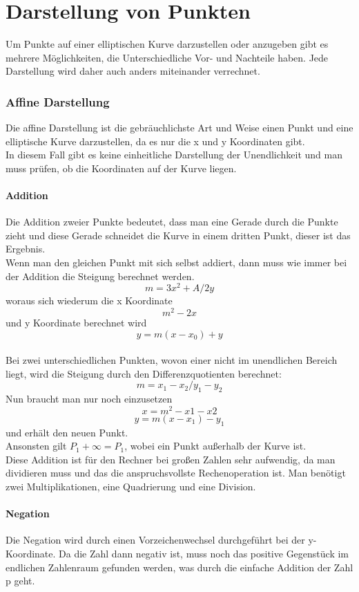 \chapter{Darstellung von Punkten}
Um Punkte auf einer elliptischen Kurve darzustellen oder anzugeben gibt es mehrere Möglichkeiten, die Unterschiedliche Vor- und Nachteile haben. Jede Darstellung wird daher auch anders miteinander verrechnet.
\subsection{Affine Darstellung}
Die affine Darstellung ist die gebräuchlichste Art und Weise einen Punkt und eine elliptische Kurve darzustellen, da es nur die x und y Koordinaten gibt.\\
In diesem Fall gibt es keine einheitliche Darstellung der Unendlichkeit und man muss prüfen, ob die Koordinaten auf der Kurve liegen.
\subsubsection{Addition}
Die Addition zweier Punkte bedeutet, dass man eine Gerade durch die Punkte zieht und diese Gerade schneidet die Kurve in einem dritten Punkt, dieser ist das Ergebnis.\\
Wenn man den gleichen Punkt mit sich selbst addiert, dann muss wie immer bei der Addition die Steigung berechnet werden. \[m = 3x^2+A / 2y\]
woraus sich wiederum die x Koordinate \[m^2-2x\] und y Koordinate berechnet wird \[y = m(x - x_0)+y\]\\
Bei zwei unterschiedlichen Punkten, wovon einer nicht im unendlichen Bereich liegt, wird die Steigung durch den Differenzquotienten berechnet: \[m = x_1-x_2 / y_1 - y_2\]
Nun braucht man nur noch einzusetzen \[x = m^2 -x1 - x2\] \[y = m(x-x_1)-y_1\] und erhält den neuen Punkt.\\
Ansonsten gilt \(P_1 + \infty = P_1\), wobei \infty ein Punkt außerhalb der Kurve ist.\\
Diese Addition ist für den Rechner bei großen Zahlen sehr aufwendig, da man dividieren muss und das die anspruchsvollste Rechenoperation ist. Man benötigt zwei Multiplikationen, eine Quadrierung und eine Division.
\subsubsection{Negation}
Die Negation wird durch einen Vorzeichenwechsel durchgeführt bei der y-Koordinate. Da die Zahl dann negativ ist, muss noch das positive Gegenstück im endlichen Zahlenraum gefunden werden, was durch die einfache Addition der Zahl p geht.
